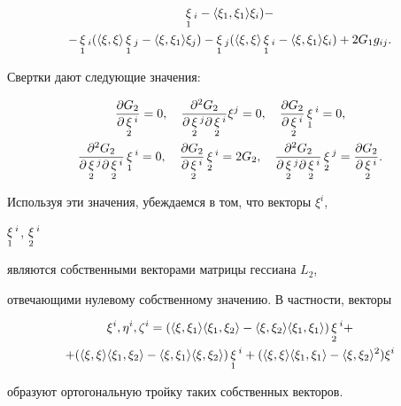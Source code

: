 \begin{pf}
\begin{gather*}
\mymath{\xi}_1{}_i-\la\xi_1,\xi_1\ra\xi_i)- \\ 


% 


-\mymath{\xi}_1{}_i(\la\xi,\xi\ra\mymath{\xi}_1{}_j- 


\la\xi,\xi_1\ra\xi_j)-\mymath{\xi}_1{}_j(\la\xi,\xi\ra 


\mymath{\xi}_1{}_i-\la\xi,\xi_1\ra\xi_i)+2G_1g_{ij}. 


\end{gather*} 


Свертки дают следующие значения: 


\begin{gather*} 


\frac{\partial G_2}{\partial\mymath{\xi}_2{}^i}=0,\quad 


\frac{\partial^2G_2}{\partial\mymath{\xi}_2{}^j 


\partial\mymath{\xi}_2{}^i}\xi^j=0,\quad 


\frac{\partial G_2}{\partial\mymath{\xi}_2{}^i} 


\mymath{\xi}_1{}^i=0,\\ 


% 


\frac{\partial^2G_2}{\partial\mymath{\xi}_2{}^j 


\partial\mymath{\xi}_2{}^i}\mymath{\xi}_1{}^i=0,\quad 


\frac{\partial G_2}{\partial\mymath{\xi}_2{}^i} 


\mymath{\xi}_2{}^i=2G_2,\quad 


\frac{\partial^2G_2}{\partial\mymath{\xi}_2{}^j 


\partial\mymath{\xi}_2{}^i}\mymath{\xi}_2{}^j= 


\frac{\partial G_2}{\partial\mymath{\xi}_2{}^i}. 


\end{gather*} 


Используя эти значения, убеждаемся в том, что векторы $\xi^i$, 


$\mathop{\xi}\limits_1{}^i$, $\mathop{\xi}\limits_2{}^i$ 


являются собственными векторами матрицы гессиана $L_2$, 


отвечающими нулевому собственному значению. В частности, векторы 


\begin{multline*} 


\xi^i,\eta^i,\zeta^i=(\la\xi,\xi_1\ra \la\xi_1,\xi_2\ra- 


\la\xi,\xi_2\ra \la\xi_1,\xi_1\ra)\mymath{\xi}_2{}^i+ \\ 


% 


+(\la\xi,\xi\ra \la\xi_1,\xi_2\ra- \la\xi,\xi_1\ra 


\la\xi,\xi_2\ra)\mymath{\xi}_1{}^i+(\la\xi,\xi\ra 


\la\xi_1,\xi_1\ra-\la\xi,\xi_2\ra^2)\xi^i 


\end{multline*} 


образуют ортогональную тройку таких собственных векторов. 


\end{pf} 


